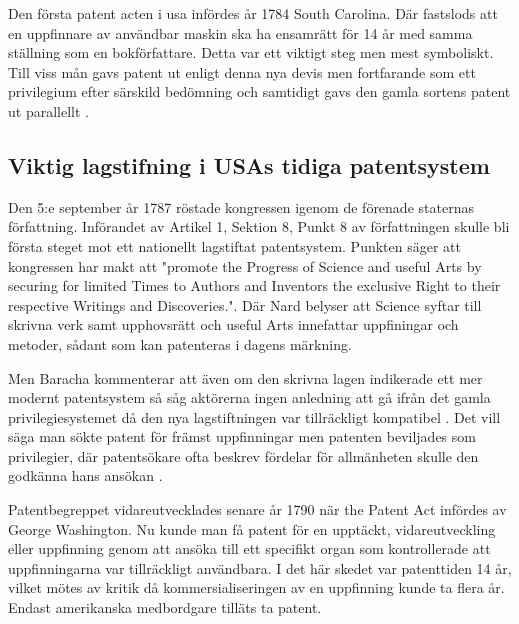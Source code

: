 Den första patent acten i usa infördes år 1784 South Carolina. Där fastslods att en uppfinnare av
användbar maskin ska ha ensamrätt för 14 år med samma ställning som en bokförfattare\cite{bracha}. Detta var ett viktigt steg men mest symboliskt. Till viss mån gavs patent ut enligt
denna nya devis men fortfarande som ett privilegium efter särskild bedömning och samtidigt gavs den gamla
sortens patent ut parallellt \cite{bracha}.



\subsection{Viktig lagstifning i USAs tidiga patentsystem}

Den 5:e september år 1787 röstade kongressen igenom de förenade staternas författning. Införandet av Artikel 1, Sektion 8, Punkt 8 av författningen skulle bli första steget mot ett nationellt lagstiftat patentsystem. Punkten säger att kongressen har
makt att "promote the Progress of Science and useful Arts by securing for limited Times to Authors and
Inventors the exclusive Right to their respective Writings and Discoveries.". Där Nard belyser att
Science syftar till skrivna verk samt upphovsrätt och useful Arts innefattar uppfiningar och metoder,
sådant som kan patenteras i dagens märkning\cite{nard}. 



Men Baracha kommenterar att även om den skrivna lagen indikerade ett mer modernt patentsystem så såg aktörerna ingen anledning att gå ifrån det gamla privilegiesystemet då den nya lagstiftningen var tillräckligt kompatibel \cite{bracha}. Det vill säga man sökte patent för främst uppfinningar men patenten beviljades som privilegier, där patentsökare ofta beskrev fördelar för allmänheten skulle den godkänna hans ansökan \cite{bracha}. %

Patentbegreppet vidareutvecklades senare år 1790 när the Patent Act infördes av George Washington. Nu
kunde man få patent för en upptäckt, vidareutveckling eller uppfinning genom att ansöka till ett
specifikt organ som kontrollerade att uppfinningarna var tillräckligt användbara\cite{nard}. I det här skedet var patenttiden 14 år, vilket mötes av kritik då kommersialiseringen 
 av en uppfinning kunde ta flera år. Endast amerikanska medbordgare tilläts ta patent\cite{nard}.  

